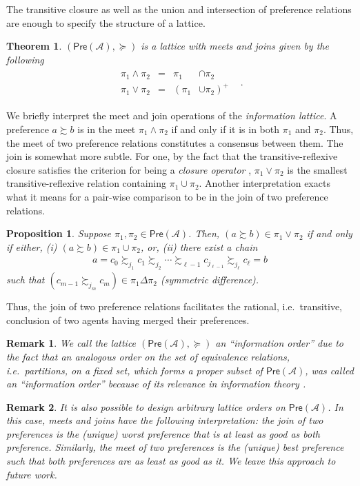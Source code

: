\documentclass[conference]{ieeeconf}
\newcommand{\A}{\mathcal{A}}
\newcommand{\Pref}{\mathsf{Pre}}
\newcommand{\prefers}{\succsim}
\newcommand{\join}{\vee}
\newcommand{\meet}{\wedge}
\newtheorem{theorem}{Theorem}
\newtheorem{proposition}{Proposition}
\newtheorem{remark}{Remark}
\begin{document}
The transitive closure as well as the union and intersection of preference relations are enough to specify the structure of a lattice.

\begin{theorem}
    $(\Pref(\A), \succeq)$ is a lattice with meets and joins given by the following
    \leavevmode
    \begin{align}
    \begin{aligned}
        \pi_1 \meet \pi_2 &=& \pi_1 &\cap \pi_2& \\
 \pi_1 \join \pi_2 &=&  \left(\pi_1  \right. &\left. \cup \pi_2  \right)^{+}
    \end{aligned}. \label{eq:join-meets}
\end{align}
\end{theorem}

We briefly interpret the meet and join operations of the \emph{information lattice}. A preference $a \prefers b$ is in the meet $\pi_1 \meet \pi_2$ if and only if it is in both $\pi_1$ and $\pi_2$. Thus, the meet of two preference relations constitutes a consensus between them. The join is somewhat more subtle. For one, by the fact that the transitive-reflexive closure satisfies the criterion for being a \emph{closure operator} \cite{roman}, $\pi_1 \join \pi_2$ is the smallest transitive-reflexive relation containing $\pi_1 \cup \pi_2$. Another interpretation exacts what it means for a pair-wise comparison to be in the join of two preference relations.
\begin{proposition}
    Suppose $\pi_1, \pi_2 \in \Pref(\A)$. Then, $(a \prefers b) \in \pi_1 \join \pi_2$ if and only if either, (i) $(a \prefers b) \in \pi_1 \cup \pi_2$, or, (ii) there exist a chain
    \begin{align}
        a = c_0 \prefers_{j_1} c_1 \prefers_{j_2}  \cdots \prefers_{\ell-1} c_{j_{\ell-1}} \prefers_{j_\ell} c_{\ell} = b \label{eq:chain}
    \end{align}
    such that $\left( c_{m-1} \prefers_{{j_m}} c_{m} \right) \in \pi_1 \Delta \pi_2$ (symmetric difference).
\end{proposition}

Thus, the join of two preference relations facilitates the rational, i.e.~transitive, conclusion of two agents having merged their preferences.

\begin{remark}
    We call the lattice $(\Pref(\A), \succeq)$ an ``information order'' due to the fact that an analogous order on the set of equivalence relations, i.e.~partitions, on a fixed set, which forms a proper subset of $\Pref(\A)$, was called an ``information order'' because of its relevance in information theory \cite{shannon}.
\end{remark}
\begin{remark}
    It is also possible to design arbitrary lattice orders on $\Pref(\A)$. In this case, meets and joins have the following interpretation: the join of two preferences is the (unique) worst preference that is at least as good as both preference. Similarly, the meet of two preferences is the (unique) best preference such that both preferences are as least as good as it. We leave this approach to future work.
\end{remark}
\end{document}
